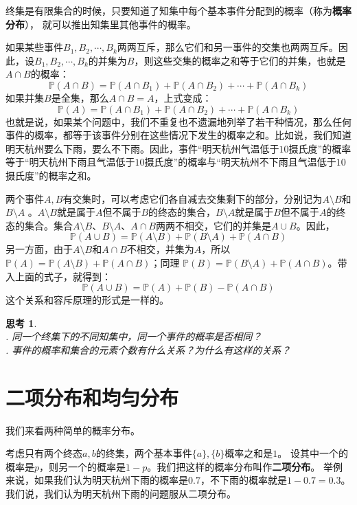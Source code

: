 \documentclass[12pt,UTF8]{ctexbook}
\newtheorem{sk}{思考}[section]
\begin{document}
终集是有限集合的时候，只要知道了知集中每个基本事件分配到的概率（称为\textbf{概率分布}），
就可以推出知集里其他事件的概率。

如果某些事件$B_1, B_2, \cdots, B_k$两两互斥，那么它们和另一事件的交集也两两互斥。因此，设$B_1, B_2, \cdots, B_k$的并集为$B$，则这些交集的概率之和等于它们的并集，也就是$A\cap B$的概率：
$$
\mathbb{P}(A\cap B) = \mathbb{P}(A\cap B_1) + \mathbb{P}(A\cap B_2) + \cdots + \mathbb{P}(A\cap B_k)
$$
如果并集$B$是全集，那么$A\cap B = A$，上式变成：
$$
\mathbb{P}(A) = \mathbb{P}(A\cap B_1) + \mathbb{P}(A\cap B_2) + \cdots + \mathbb{P}(A\cap B_k)
$$
也就是说，如果某个问题中，我们不重复也不遗漏地列举了若干种情况，那么任何事件的概率，都等于该事件分别在这些情况下发生的概率之和。比如说，我们知道明天杭州要么下雨，要么不下雨。因此，事件“明天杭州气温低于$10$摄氏度”的概率等于“明天杭州下雨且气温低于$10$摄氏度”的概率与“明天杭州不下雨且气温低于$10$摄氏度”的概率之和。

两个事件$A, B$有交集时，可以考虑它们各自减去交集剩下的部分，分别记为$A\setminus B$和$B\setminus A$ 。$A \setminus B$就是属于$A$但不属于$B$的终态的集合，$B \setminus A$就是属于$B$但不属于$A$的终态的集合。集合$A \setminus B$、$B \setminus A$、$A\cap B$两两不相交，它们的并集是$A\cup B$。因此，
$$
\mathbb{P}(A\cup B) = \mathbb{P}(A \setminus B) + \mathbb{P}(B \setminus A) + \mathbb{P}(A \cap B)
$$
另一方面，由于$A \setminus B$和$A\cap B$不相交，并集为$A$，所以$ \mathbb{P}(A) = \mathbb{P}(A \setminus B) +  \mathbb{P}(A \cap B)$；同理 $\mathbb{P}(B) = \mathbb{P}(B \setminus A) + \mathbb{P}(A \cap B)$。带入上面的式子，就得到：
$$
\mathbb{P}(A\cup B) = \mathbb{P}(A) + \mathbb{P}(B) - \mathbb{P}(A \cap B)
$$
这个关系和容斥原理的形式是一样的。


\begin{sk}
    \mbox{} \\
    . 同一个终集下的不同知集中，同一个事件的概率是否相同？\\
    . 事件的概率和集合的元素个数有什么关系？为什么有这样的关系？
\end{sk}

\section{二项分布和均匀分布}

我们来看两种简单的概率分布。

考虑只有两个终态$a, b$的终集，两个基本事件$\{a\}, \{b\}$概率之和是$1$。
设其中一个的概率是$p$，则另一个的概率是$1-p$。我们把这样的概率分布叫作\textbf{二项分布}。
举例来说，如果我们认为明天杭州下雨的概率是$0.7$，不下雨的概率就是$1-0.7=0.3$。
我们说，我们认为明天杭州下雨的问题服从二项分布。
\end{document}

